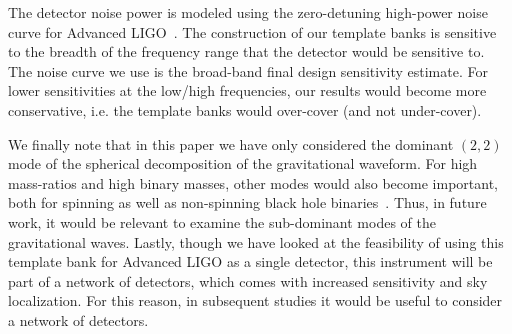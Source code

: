 \documentclass[aps,
prd,
twocolumn,
superscriptaddress,
lengthcheck,showpacs,letterpaper,nofootinbib,
floatfix]{revtex4-1}
\begin{document}
The detector noise power is modeled using the zero-detuning high-power 
noise curve for Advanced LIGO~\cite{aLIGONoiseCurve}.
The construction of our template banks is sensitive to the breadth
of the frequency range that the detector would be 
sensitive to. The noise curve we use is the broad-band final design 
sensitivity estimate. For lower sensitivities
at the low/high frequencies, our results would become more conservative, 
i.e. the template banks would over-cover (and not under-cover).

We finally note that in this paper we have only considered the
dominant $(2,2)$ mode of the spherical decomposition of the 
gravitational waveform. For high mass-ratios and high binary masses,
other modes would also become important, both for spinning as well
as non-spinning black hole binaries~\cite{Pekowsky:2012sr,
Brown:2012nn,Capano:2013inPrep}.
Thus, in future work, it would be relevant to examine the
sub-dominant modes of the gravitational waves. Lastly, though we have
looked at the feasibility of using this template bank for Advanced
LIGO as a single detector, this instrument will be part of a network
of detectors, which comes with increased sensitivity and sky
localization. For this reason, in subsequent studies it would be
useful to consider a network of detectors.

\acknowledgments

\end{document}
